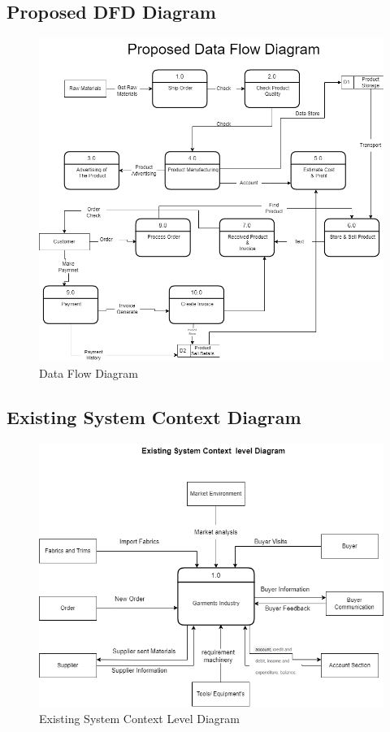 \documentclass{article}
\begin{document}
\subsection{Proposed DFD Diagram}
\begin{figure}[h!]
\centering
\includegraphics[width=13cm]{img/dfd diagram.drawio.png}
\caption{Data Flow Diagram}
\label{dfd}
\end{figure}
\newpage
\subsection{Existing System Context Diagram}
\begin{figure}[h]
    \centering
    \includegraphics[width=13 cm]{img/exiting context diagram.png}
    \caption{Existing System Context Level Diagram}
    \label{fig:my_label}
\end{figure}
\newpage
\end{document}
